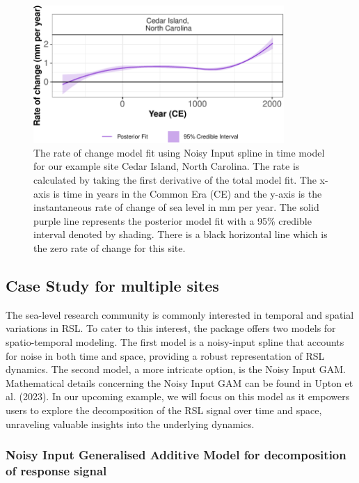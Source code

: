 \begin{figure}

{\centering \includegraphics[width=360px]{reslr_files/figure-latex/nisplinemodrate-1} 

}

\caption{The rate of change model fit using Noisy Input spline in time model for our example site Cedar Island, North Carolina. The rate is calculated by taking the first derivative of the total model fit. The x-axis is time in years in the Common Era (CE) and the y-axis is the instantaneous rate of change of sea level in mm per year. The solid purple line represents the posterior model fit with a 95\% credible interval denoted by shading. There is a black horizontal line which is the zero rate of change for this site.}\label{fig:nisplinemodrate}
\end{figure}

\normalsize

\hypertarget{casestudy2}{%
\subsection{Case Study for multiple sites}\label{casestudy2}}

The sea-level research community is commonly interested in temporal and spatial variations in RSL. To cater to this interest, the  package offers two models for spatio-temporal modeling. The first model is a noisy-input spline that accounts for noise in both time and space, providing a robust representation of RSL dynamics. The second model, a more intricate option, is the Noisy Input GAM. Mathematical details concerning the Noisy Input GAM can be found in Upton et al. (2023). In our upcoming example, we will focus on this model as it empowers users to explore the decomposition of the RSL signal over time and space, unraveling valuable insights into the underlying dynamics.

\hypertarget{casestudy2nigam}{%
\subsubsection{Noisy Input Generalised Additive Model for decomposition of response signal}\label{casestudy2nigam}}

